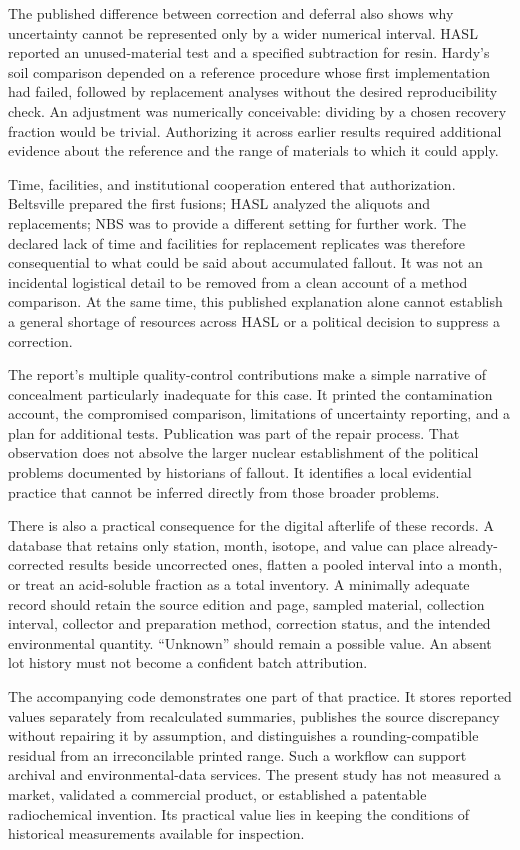 \documentclass[11pt,a4paper]{article}
\begin{document}
The published difference between correction and deferral also shows why uncertainty cannot be represented only by a wider numerical interval. HASL reported an unused-material test and a specified subtraction for resin. Hardy's soil comparison depended on a reference procedure whose first implementation had failed, followed by replacement analyses without the desired reproducibility check. An adjustment was numerically conceivable: dividing by a chosen recovery fraction would be trivial. Authorizing it across earlier results required additional evidence about the reference and the range of materials to which it could apply.

Time, facilities, and institutional cooperation entered that authorization. Beltsville prepared the first fusions; HASL analyzed the aliquots and replacements; NBS was to provide a different setting for further work. The declared lack of time and facilities for replacement replicates was therefore consequential to what could be said about accumulated fallout. It was not an incidental logistical detail to be removed from a clean account of a method comparison. At the same time, this published explanation alone cannot establish a general shortage of resources across HASL or a political decision to suppress a correction.

The report's multiple quality-control contributions make a simple narrative of concealment particularly inadequate for this case. It printed the contamination account, the compromised comparison, limitations of uncertainty reporting, and a plan for additional tests. Publication was part of the repair process. That observation does not absolve the larger nuclear establishment of the political problems documented by historians of fallout. It identifies a local evidential practice that cannot be inferred directly from those broader problems.

There is also a practical consequence for the digital afterlife of these records. A database that retains only station, month, isotope, and value can place already-corrected results beside uncorrected ones, flatten a pooled interval into a month, or treat an acid-soluble fraction as a total inventory. A minimally adequate record should retain the source edition and page, sampled material, collection interval, collector and preparation method, correction status, and the intended environmental quantity. ``Unknown'' should remain a possible value. An absent lot history must not become a confident batch attribution.

The accompanying code demonstrates one part of that practice. It stores reported values separately from recalculated summaries, publishes the source discrepancy without repairing it by assumption, and distinguishes a rounding-compatible residual from an irreconcilable printed range. Such a workflow can support archival and environmental-data services. The present study has not measured a market, validated a commercial product, or established a patentable radiochemical invention. Its practical value lies in keeping the conditions of historical measurements available for inspection.
\end{document}

